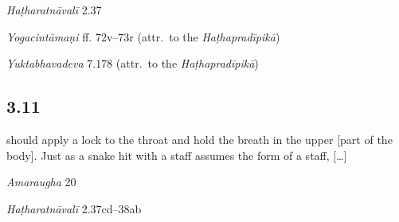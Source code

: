 \begin{ekdosis}
\begin{testimonia}[hp03_010]
\emph{Haṭharatnāvalī} 2.37
\begin{versinnote}
\tl{\var{mukham ] mukhe \vl}\\!}
\end{versinnote}

\emph{Yogacintāmaṇi} ff. 72v–73r (attr.~to the \emph{Haṭhapradīpikā})
\begin{versinnote}
\end{versinnote}

\emph{Yuktabhavadeva} 7.178 (attr.~to the \emph{Haṭhapradīpikā})
\begin{versinnote}
\end{versinnote}
\end{testimonia}


\subsection*{3.11}
\begin{translation} should apply a lock to the throat and hold the breath in the upper [part of the body]. Just as a snake hit with a staff assumes the form of a staff, [\dots] 
\end{translation}

\begin{sources}[hp03_011]
\emph{Amaraugha} 20
\begin{versinnote}
\end{versinnote}
\end{sources}

\begin{testimonia}[hp03_011]
\emph{Haṭharatnāvalī} 2.37cd–38ab
\begin{versinnote}
\end{versinnote}


\end{testimonia}
\end{ekdosis}
